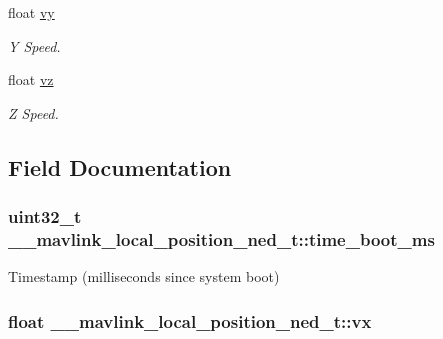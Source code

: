\begin{DoxyCompactItemize}
float \hyperlink{struct____mavlink__local__position__ned__t_a0e9a5142819014e5807a657409608fa6}{vy}
\begin{DoxyCompactList}\small\item\em Y Speed. \end{DoxyCompactList}\item 
float \hyperlink{struct____mavlink__local__position__ned__t_aa34bbb949b0afd4bd524f455b9d980f6}{vz}
\begin{DoxyCompactList}\small\item\em Z Speed. \end{DoxyCompactList}\end{DoxyCompactItemize}


\subsection{Field Documentation}
\hypertarget{struct____mavlink__local__position__ned__t_a00187442905b1327719d9fde885a9bf9}{
\subsubsection[{time\+\_\+boot\+\_\+ms}]{\setlength{\rightskip}{0pt plus 5cm}uint32\+\_\+t \+\_\+\+\_\+mavlink\+\_\+local\+\_\+position\+\_\+ned\+\_\+t\+::time\+\_\+boot\+\_\+ms}}\label{struct____mavlink__local__position__ned__t_a00187442905b1327719d9fde885a9bf9}


Timestamp (milliseconds since system boot) 

\hypertarget{struct____mavlink__local__position__ned__t_a87216fec6527221da8812d77d8d84eb1}{
\subsubsection[{vx}]{\setlength{\rightskip}{0pt plus 5cm}float \+\_\+\+\_\+mavlink\+\_\+local\+\_\+position\+\_\+ned\+\_\+t\+::vx}}\label{struct____mavlink__local__position__ned__t_a87216fec6527221da8812d77d8d84eb1}


